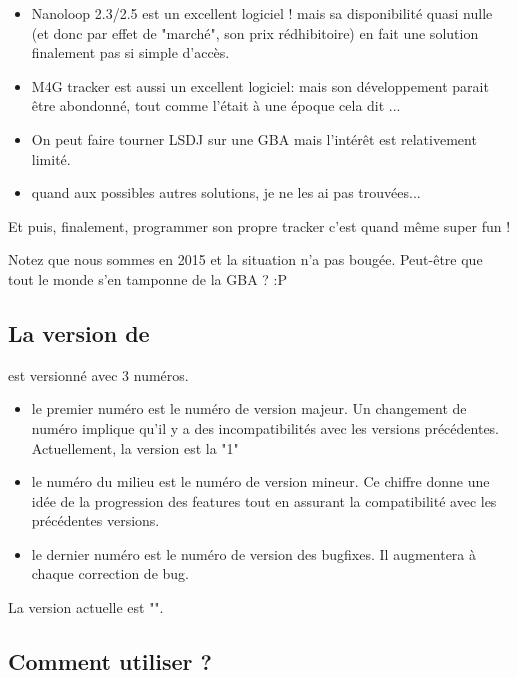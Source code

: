 \documentclass[12pt,a4paper]{article}
\begin{document}
    \begin{itemize}
        \item{Nanoloop 2.3/2.5 est un excellent logiciel ! mais sa disponibilité quasi nulle (et donc par effet de "marché", son prix rédhibitoire) en fait une solution finalement pas si simple d'accès.}
        \item{M4G tracker est aussi un excellent logiciel: mais son développement parait être abondonné, tout comme l'était \FAT à une époque cela dit ...}
        \item{On peut faire tourner LSDJ sur une GBA mais l'intérêt est relativement limité.}
        \item{quand aux possibles autres solutions, je ne les ai pas trouvées...}
    \end{itemize}\medskip
    
    Et puis, finalement, programmer son propre tracker c'est quand même super fun !
    \medskip

    Notez que nous sommes en 2015 et la situation n'a pas bougée. Peut-être que tout le monde s'en tamponne de la GBA ? :P \medskip

    \subsection{La version de \FAT}

    \FAT est versionné avec 3 numéros.
    \begin{itemize}
        \item{le premier numéro est le numéro de version majeur. Un changement de numéro implique qu'il y a des incompatibilités avec les versions précédentes.
                    Actuellement, la version est la "1"}
        \item{le numéro du milieu est le numéro de version mineur.
                    Ce chiffre donne une idée de la progression des features tout en assurant la compatibilité avec les précédentes versions.}
        \item{le dernier numéro est le numéro de version des bugfixes. Il augmentera à chaque correction de bug.}
    \end{itemize}
    \medskip

    La version actuelle est "\fatversion".
    
    \subsection{Comment utiliser \FAT ?}
\end{document}
